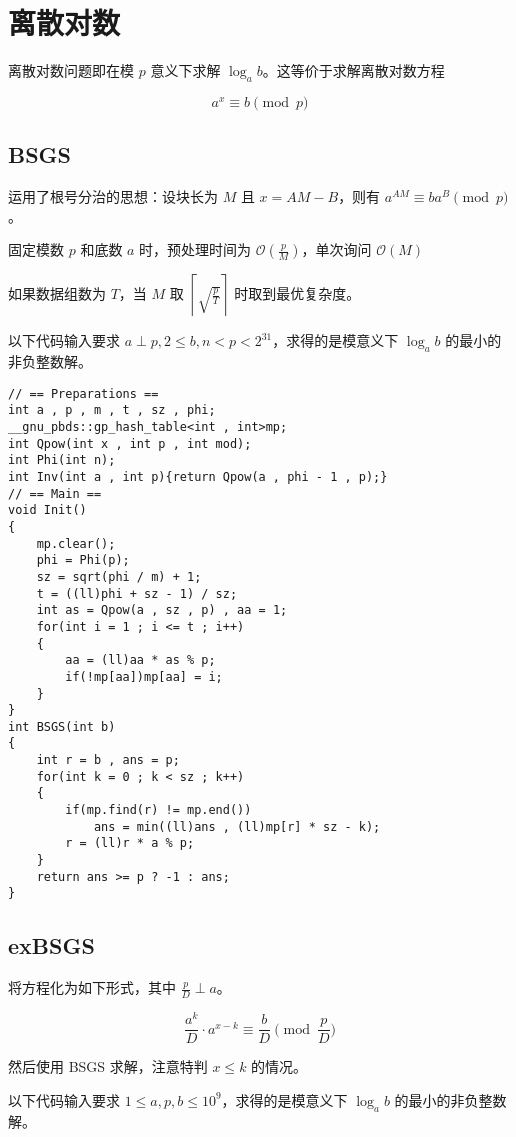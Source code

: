 \section{离散对数}

离散对数问题即在模 $p$ 意义下求解 $\log_{a}{b}$。这等价于求解离散对数方程

$$a^x \equiv b\pmod p$$

\subsection{BSGS}

运用了根号分治的思想：设块长为 $M$ 且 $x=AM-B$，则有 $a^{AM} \equiv ba^{B} \pmod p$。

固定模数 $p$ 和底数 $a$ 时，预处理时间为 $\mathcal{O}(\frac{p}{M})$，单次询问 $\mathcal{O}(M)$

如果数据组数为 $T$，当 $M$ 取 $\left \lceil \sqrt{\frac{p}{T}} \right \rceil$ 时取到最优复杂度。

以下代码输入要求 $a \perp p,2\le b,n < p<2^{31}$，求得的是模意义下 $\log_{a}{b}$ 的最小的非负整数解。

\begin{verbatim}
// == Preparations ==
int a , p , m , t , sz , phi; 
__gnu_pbds::gp_hash_table<int , int>mp;
int Qpow(int x , int p , int mod);
int Phi(int n);
int Inv(int a , int p){return Qpow(a , phi - 1 , p);}
// == Main ==
void Init()
{
    mp.clear();
    phi = Phi(p); 
    sz = sqrt(phi / m) + 1;
    t = ((ll)phi + sz - 1) / sz;
    int as = Qpow(a , sz , p) , aa = 1;
    for(int i = 1 ; i <= t ; i++)
    {
        aa = (ll)aa * as % p;
        if(!mp[aa])mp[aa] = i;
    }
}
int BSGS(int b)
{
    int r = b , ans = p;
    for(int k = 0 ; k < sz ; k++)
    {
        if(mp.find(r) != mp.end())
            ans = min((ll)ans , (ll)mp[r] * sz - k);
        r = (ll)r * a % p;
    }
    return ans >= p ? -1 : ans;
}
\end{verbatim}

\subsection{exBSGS}

将方程化为如下形式，其中 $\frac{p}{D} \perp a$。

$$\frac{a^k}{D}\cdot a^{x-k}\equiv\frac{b}{D} \pmod{\frac{p}{D}}$$

然后使用 BSGS 求解，注意特判 $x \le k$ 的情况。

以下代码输入要求 $1\le a,p,b\le10^9$，求得的是模意义下 $\log_{a}{b}$ 的最小的非负整数解。

